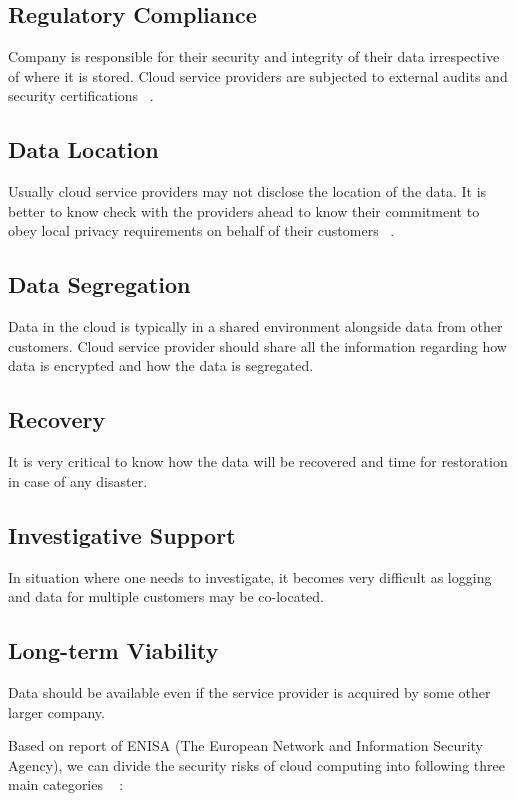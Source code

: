 \documentclass[sigconf]{acmart}
\begin{document}
\subsection{Regulatory Compliance}
Company is responsible for their security and integrity of their data irrespective
of where it is stored. Cloud service providers are subjected to external audits
and security certifications ~\cite{hid-sp18-513-gartner}. 

\subsection{Data Location} 
Usually cloud service providers may not disclose the location of the data.
It is better to know check with the providers ahead to know their commitment to
obey local privacy requirements on behalf of their customers ~\cite{hid-sp18-513-gartner}.

\subsection{Data Segregation} 
Data in the cloud is typically in a shared environment alongside data from 
other customers. Cloud service provider should share all the information
regarding how data is encrypted and how the data is segregated.

\subsection{Recovery} 
It is very critical to know how the data will be recovered and time for restoration
in case of any disaster. 

\subsection{Investigative Support} 
In situation where one needs to investigate, it becomes very difficult as logging 
and data for multiple customers may be co-located.

\subsection{Long-term Viability} 
Data should be available even if the service provider is acquired by some
other larger company.


Based on report of ENISA (The European Network and Information Security Agency),
we can divide the security risks of cloud computing into following three main 
categories ~\cite{hid-sp18-513-enisa} :
\end{document}
